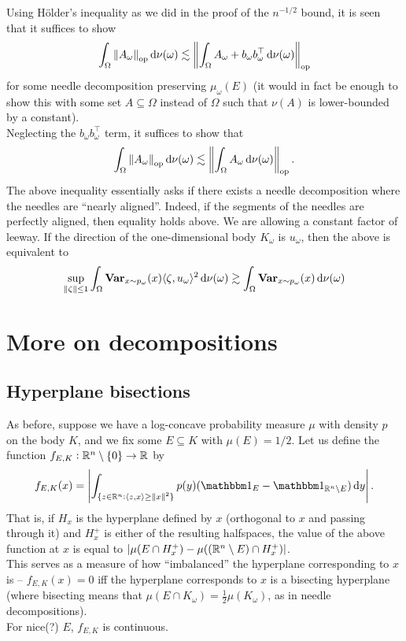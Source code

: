 \documentclass{article}
\begin{document}
		Using H\"{o}lder's inequality as we did in the proof of the $n^{-1/2}$ bound, it is seen that it suffices to show
		\[ \int_\Omega \left\lVert A_\omega\right\rVert_{\text{op}} \operatorname{d}\!{\nu(\omega)} \lesssim \left\lVert \int_\Omega A_\omega + b_\omega b_\omega^\top \operatorname{d}\!{\nu(\omega)} \right\rVert_{\text{op}} \]
		for some needle decomposition preserving $\mu_\omega(E)$ (it would in fact be enough to show this with some set $A\subseteq \Omega$ instead of $\Omega$ such that $\nu(A)$ is lower-bounded by a constant).\\
		Neglecting the $b_\omega b_\omega^\top$ term, it suffices to show that
		\begin{equation}
			\label{eqn: needle nearly aligned}
			\int_\Omega \left\lVert A_\omega\right\rVert_{\text{op}} \operatorname{d}\!{\nu(\omega)} \lesssim \left\lVert \int_\Omega A_\omega \operatorname{d}\!{\nu(\omega)} \right\rVert_{\text{op}}.
		\end{equation}
		The above inequality essentially asks if there exists a needle decomposition where the needles are ``nearly aligned''. Indeed, if the segments of the needles are perfectly aligned, then equality holds above. We are allowing a constant factor of leeway. If the direction of the one-dimensional body $K_\omega$ is $u_\omega$, then the above is equivalent to
		\begin{equation}
			\sup_{\norm{\zeta} \leq 1} \int_\Omega \Var_{x \sim p_\omega}(x) \langle \zeta , u_\omega \rangle^2 \dif \nu(\omega) \gtrsim \int_\Omega \Var_{x \sim p_\omega}(x) \dif \nu(\omega)	
		\end{equation}

\section{More on decompositions}

	\subsection{Hyperplane bisections}

		As before, suppose we have a log-concave probability measure $\mu$ with density $p$ on the body $K$, and we fix some $E \subseteq K$ with $\mu(E) = 1/2$. Let us define the function $f_{E,K} : \mathbb{R}^n \setminus \{0\} \to \mathbb{R}$ by
		\[ f_{E,K}(x) = \left| \int_{\{ z \in \Rn : \langle z , x \rangle \geq \norm{x}^2 \}} p(y) ( \indic_E - \indic_{\Rn \setminus E} ) \dif y \right|. \]
		That is, if $H_x$ is the hyperplane defined by $x$ (orthogonal to $x$ and passing through it) and $H_x^+$ is either of the resulting halfspaces, the value of the above function at $x$ is equal to $|\mu(E \cap H_x^+) - \mu((\mathbb{R}^n\setminus E) \cap H_x^+)|$.\\
		This serves as a measure of how ``imbalanced'' the hyperplane corresponding to $x$ is -- $f_{E,K}(x) = 0$ iff the hyperplane corresponds to $x$ is a bisecting hyperplane (where bisecting means that $\mu(E \cap K_\omega) = \frac{1}{2} \mu(K_\omega) $, as in needle decompositions).\\
		For nice(?) $E$, $f_{E,K}$ is continuous.\\
\end{document}

